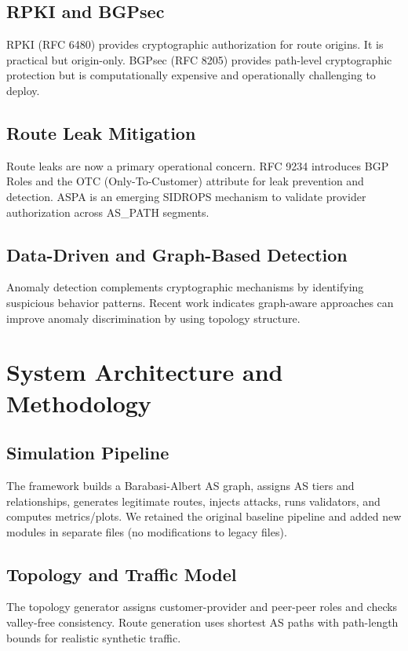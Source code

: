 \documentclass[conference]{IEEEtran}
\begin{document}
\subsection{RPKI and BGPsec}
RPKI (RFC 6480) provides cryptographic authorization for route origins. It is practical but origin-only. BGPsec (RFC 8205) provides path-level cryptographic protection but is computationally expensive and operationally challenging to deploy.

\subsection{Route Leak Mitigation}
Route leaks are now a primary operational concern. RFC 9234 introduces BGP Roles and the OTC (Only-To-Customer) attribute for leak prevention and detection. ASPA is an emerging SIDROPS mechanism to validate provider authorization across AS\_PATH segments.

\subsection{Data-Driven and Graph-Based Detection}
Anomaly detection complements cryptographic mechanisms by identifying suspicious behavior patterns. Recent work indicates graph-aware approaches can improve anomaly discrimination by using topology structure.

\section{System Architecture and Methodology}
\subsection{Simulation Pipeline}
The framework builds a Barabasi-Albert AS graph, assigns AS tiers and relationships, generates legitimate routes, injects attacks, runs validators, and computes metrics/plots. We retained the original baseline pipeline and added new modules in separate files (no modifications to legacy files).

\subsection{Topology and Traffic Model}
The topology generator assigns customer-provider and peer-peer roles and checks valley-free consistency. Route generation uses shortest AS paths with path-length bounds for realistic synthetic traffic.
\end{document}
